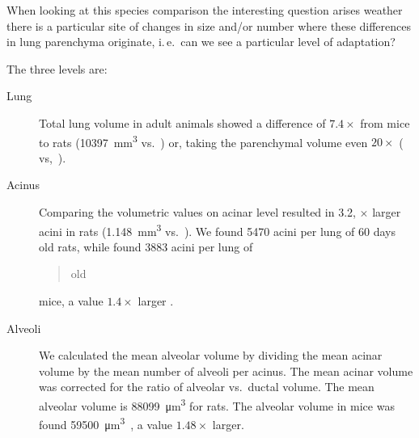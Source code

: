 \documentclass[paper=a4,twocolumn=true,DIV=calc,abstract,english]{scrartcl}
\newcommand{\ie}{i.\,e.\ }
\newcommand{\meantotalnumberofaciniVariant}{5470\xspace}
\newcommand{\meanacinarvolume}{1.148} %
\newcommand{\meantotallungvolume}{10397} %
\begin{document}
When looking at this species comparison the interesting question arises weather there is a particular site of changes in size and/or number where these differences in lung parenchyma originate, \ie can we see a particular level of adaptation?

The three levels are:
\begin{description}
	\item[Lung] Total lung volume in adult animals showed a difference of \(7.4\times\) from mice to rats (\SI{\meantotallungvolume}{\cubic\milli\meter} vs.\ \citep[\SI{1398}{\cubic\milli\meter}]{Vasilescu2012}) or, taking the parenchymal volume even \(20\times\) (\citep[\SI{8932}{\cubic\milli\meter}]{Tschanz2003} vs,\ \citep[\SI{444}{\cubic\milli\meter}]{Mund2008}).
	\item[Acinus] Comparing the volumetric values on acinar level resulted in 3.2, \(\times\) larger acini in rats (\SI{\meanacinarvolume}{\cubic\milli\meter} vs.\ \citep[\SI{0.36}{\cubic\milli\meter}]{Vasilescu2012}).
We found \meantotalnumberofaciniVariant acini per lung of 60 days old rats, while \citet{Vasilescu2012} found 3883 acini per lung of \blockquote{old} mice, a value \(1.4\times\) larger .
	\item[Alveoli] We calculated the mean alveolar volume by dividing the mean acinar volume by the mean number of alveoli per acinus. The mean acinar volume was corrected for the ratio of alveolar vs.\ ductal volume.
The mean alveolar volume is \SI{88099}{\cubic\micro\meter} for rats.
The alveolar volume in mice was found \SI{59500}{\cubic\micro\meter}~\citep{Knust2009}, a value \(1.48\times\) larger.
\end{description}
\end{document}

